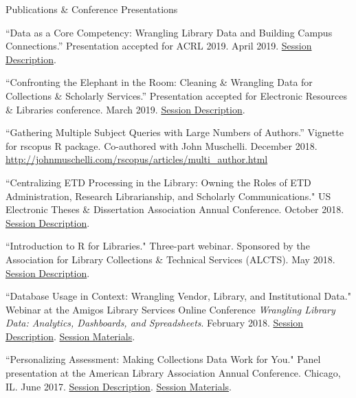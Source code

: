 \documentclass{resume} %
\begin{document}
\begin{rSection}{Publications \& Conference Presentations}

\begin{rSubsectionConf}{2em}

``Data as a Core Competency: Wrangling Library Data and Building Campus Connections.” Presentation accepted for ACRL 2019. April 2019. \href{http://s4.goeshow.com/acrl/national/2019/profile.cfm?profile_name=session&master_key=681FAAEE-D282-252F-ED91-91AC04A95FCD&page_key=126CB9A0-B53A-2A1E-9827-DF2938A26C80&xtemplate&userLGNKEY=0}{Session Description}. 
 
``Confronting the Elephant in the Room: Cleaning \& Wrangling Data for Collections \& Scholarly Services.” Presentation accepted for Electronic Resources \& Libraries conference. March 2019. \href{https://erl19.sched.com/event/I8Cx/s54-confronting-the-elephant-in-the-room-cleaning-and-wrangling-data-for-collections-and-scholarly-services}{Session Description}.

``Gathering Multiple Subject Queries with Large Numbers of Authors.” Vignette for rscopus R package. Co-authored with John Muschelli. December 2018. \url{http://johnmuschelli.com/rscopus/articles/multi_author.html}

``Centralizing ETD Processing in the Library: Owning the Roles of ETD Administration, Research Librarianship, and Scholarly Communications." US Electronic Theses \& Dissertation Association Annual Conference. October 2018. \href{http://www.ocs.usetda.org/index.php/USETDA/USETDA2018/paper/view/138}{Session Description}.

``Introduction to R for Libraries." Three-part webinar. Sponsored by the Association for Library Collections \& Technical Services (ALCTS). May 2018. \href{http://www.ala.org/alcts/confevents/upcoming/webinar/IntrotoR}{Session Description}.

``Database Usage in Context: Wrangling Vendor, Library, and Institutional Data." Webinar at the Amigos Library Services Online Conference \textit{Wrangling Library Data: Analytics, Dashboards, and Spreadsheets}. February 2018. \href{http://www.amigos.org/wrangling_data}{Session Description}. \href{http://uhcl.libguides.com/alcts/amigos}{Session Materials}.

``Personalizing Assessment: Making Collections Data Work for You." Panel presentation at the American Library Association Annual Conference.  Chicago, IL. June 2017. \href{https://alcts.ala.org/news/2017/ac-personalizing-assessment/}{Session Description}. \href{http://uhcl.libguides.com/alcts}{Session Materials}.


\end{rSubsectionConf}
\end{rSection}
\end{document}
